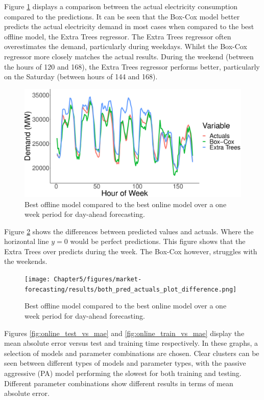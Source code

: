 Figure \ref{fig:both_actual_predicted} displays a comparison between the actual electricity consumption compared to the predictions. It can be seen that the Box-Cox model better predicts the actual electricity demand in most cases when compared to the best offline model, the Extra Trees regressor. The Extra Trees regressor often overestimates the demand, particularly during weekdays. Whilst the Box-Cox regressor more closely matches the actual results. During the weekend (between the hours of 120 and 168), the Extra Trees regressor performs better, particularly on the Saturday (between hours of 144 and 168). 


\begin{figure}
	\centering
	\includegraphics[width=0.6\columnwidth]{Chapter5/figures/market-forecasting/results/both_actual_predicted.eps}
	\caption{Best offline model compared to the best online model over a one week period for day-ahead forecasting.}
	\label{fig:both_actual_predicted}
\end{figure}

Figure \ref{fig:both_pred_actuals_plot_difference} shows the differences between predicted values and actuals. Where the horizontal line $y=0$ would be perfect predictions. This figure shows that the Extra Trees over predicts during the week. The Box-Cox however, struggles with the weekends. 

\begin{figure}
	\centering
	\texttt{[image: Chapter5/figures/market-forecasting/results/both\_pred\_actuals\_plot\_difference.png]}
	\caption{Best offline model compared to the best online model over a one week period for day-ahead forecasting.}
	\label{fig:both_pred_actuals_plot_difference}
\end{figure}

Figures \ref{fig:online_test_vs_mae} and \ref{fig:online_train_vs_mae} display the mean absolute error versus test and training time respectively. In these graphs, a selection of models and parameter combinations are chosen. Clear clusters can be seen between different types of models and parameter types, with the passive aggressive (PA) model performing the slowest for both training and testing. Different parameter combinations show different results in terms of mean absolute error.

